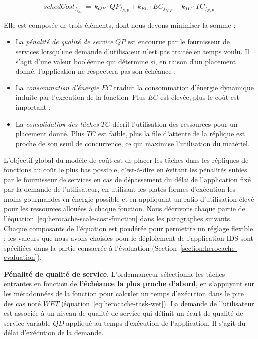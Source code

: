 \begin{equation}
    schedCost_{{f}_{{i}_{N, P}}} = \, k_{QP} \cdot QP_{{f}_{N, P}} + k_{EC} \cdot {EC}_{{f}_{N, P}} + k_{TC} \cdot TC_{{f}_{N, P}}
\label{eq:herocache-scheduling-cost-function}
\end{equation}

Elle est composée de trois éléments, dont nous devons minimiser la somme :

\begin{itemize}
    \item La \textit{pénalité de qualité de service} $QP$ est encourue par le fournisseur de services lorsqu'une demande d'utilisateur n'est pas traitée en temps voulu. Il s'agit d'une valeur booléenne qui détermine si, en raison d'un placement donné, l'application ne respectera pas son échéance ;
    \item La \textit{consommation d'énergie} $EC$ traduit la consommation d'énergie dynamique induite par l'exécution de la fonction. Plus $EC$ est élevée, plus le coût est important ;
    \item La \textit{consolidation des tâches} $TC$ décrit l'utilisation des ressources pour un placement donné. Plus $TC$ est faible, plus la file d'attente de la réplique est proche de son seuil de concurrence, ce qui maximise l'utilisation du matériel.
\end{itemize}

L'objectif global du modèle de coût est de placer les tâches dans les répliques de fonctions au coût le plus bas possible, c'est-à-dire en évitant les pénalités subies par le fournisseur de services en cas de dépassement du délai de l'application fixé par la demande de l'utilisateur, en utilisant les plates-formes d'exécution les moins gourmandes en énergie possible et en appliquant un ratio d'utilisation élevé pour les ressources allouées à chaque fonction. Nous décrivons chaque partie de l'équation~\ref{eq:herocache-scale-cost-function} dans les paragraphes suivants. Chaque composante de l'équation est pondérée pour permettre un réglage flexible ; les valeurs que nous avons choisies pour le déploiement de l'application IDS sont spécifiées dans la partie consacrée à l'évaluation (Section~\ref{section:herocache-evaluation}).

\textbf{Pénalité de qualité de service}. L'ordonnanceur sélectionne les tâches entrantes en fonction de \textbf{l'échéance la plus proche d'abord}, en s'appuyant sur les métadonnées de la fonction pour calculer un temps d'exécution dans le pire des cas noté $WET$ (équation~\ref{eq:herocache-task-wet}). La demande de l'utilisateur est associée à un niveau de qualité de service qui définit un écart de qualité de service variable $QD$ appliqué au temps d'exécution de l'application. Il s'agit du délai d'exécution de la demande.

